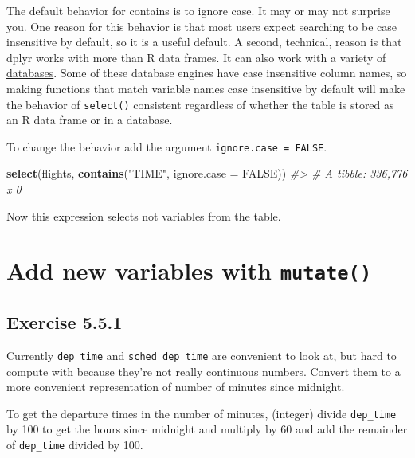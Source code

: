 \documentclass[]{book}
\newenvironment{Shaded}{\begin{snugshade}}{\end{snugshade}}
\newcommand{\CommentTok}[1]{\textcolor[rgb]{0.56,0.35,0.01}{\textit{#1}}}
\newcommand{\DataTypeTok}[1]{\textcolor[rgb]{0.13,0.29,0.53}{#1}}
\newcommand{\KeywordTok}[1]{\textcolor[rgb]{0.13,0.29,0.53}{\textbf{#1}}}
\newcommand{\NormalTok}[1]{#1}
\newcommand{\OtherTok}[1]{\textcolor[rgb]{0.56,0.35,0.01}{#1}}
\newcommand{\StringTok}[1]{\textcolor[rgb]{0.31,0.60,0.02}{#1}}
\theoremstyle{plain}
\theoremstyle{remark}
\theoremstyle{definition}
\theoremstyle{definition}
\theoremstyle{definition}
\theoremstyle{remark}
\begin{document}
The default behavior for contains is to ignore case. It may or may not
surprise you. One reason for this behavior is that most users expect
searching to be case insensitive by default, so it is a useful default.
A second, technical, reason is that dplyr works with more than R data
frames. It can also work with a variety of
\href{https://db.rstudio.com/dplyr/}{databases}. Some of these database
engines have case insensitive column names, so making functions that
match variable names case insensitive by default will make the behavior
of \texttt{select()} consistent regardless of whether the table is
stored as an R data frame or in a database.

To change the behavior add the argument \texttt{ignore.case\ =\ FALSE}.

\begin{Shaded}
\begin{Highlighting}[]
\KeywordTok{select}\NormalTok{(flights, }\KeywordTok{contains}\NormalTok{(}\StringTok{"TIME"}\NormalTok{, }\DataTypeTok{ignore.case =} \OtherTok{FALSE}\NormalTok{))}
\CommentTok{#> # A tibble: 336,776 x 0}
\end{Highlighting}
\end{Shaded}

Now this expression selects not variables from the table.

\hypertarget{add-new-variables-with-mutate}{%
\section{\texorpdfstring{Add new variables with
\texttt{mutate()}}{Add new variables with mutate()}}\label{add-new-variables-with-mutate}}

\hypertarget{exercise-5.5.1}{%
\subsection*{\texorpdfstring{Exercise
{5.5.1}}{Exercise 5.5.1}}\label{exercise-5.5.1}}

Currently \texttt{dep\_time} and \texttt{sched\_dep\_time} are
convenient to look at, but hard to compute with because they're not
really continuous numbers. Convert them to a more convenient
representation of number of minutes since midnight.

To get the departure times in the number of minutes, (integer) divide
\texttt{dep\_time} by 100 to get the hours since midnight and multiply
by 60 and add the remainder of \texttt{dep\_time} divided by 100.
\end{document}
